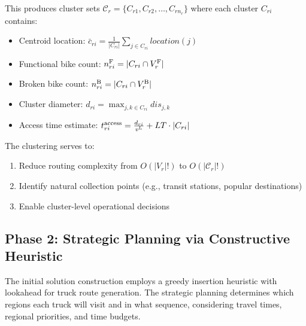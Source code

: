 This produces cluster sets $\mathcal{C}_r = \{C_{r1}, C_{r2}, \ldots, C_{rn_r}\}$ where each cluster $C_{ri}$ contains:
\begin{itemize}
    \item Centroid location: $\bar{c}_{ri} = \frac{1}{|C_{ri}|}\sum_{j \in C_{ri}} location(j)$
    \item Functional bike count: $n_{ri}^{\text{F}} = |C_{ri} \cap V_r^{\text{F}}|$
    \item Broken bike count: $n_{ri}^{\text{B}} = |C_{ri} \cap V_r^{\text{B}}|$
    \item Cluster diameter: $d_{ri} = \max_{j,k \in C_{ri}} dis_{j,k}$
    \item Access time estimate: $t_{ri}^{\text{access}} = \frac{d_{ri}}{v^{\text{L}}} + LT \cdot |C_{ri}|$
\end{itemize}

The clustering serves to:
\begin{enumerate}
    \item Reduce routing complexity from $O(|V_r|!)$ to $O(|\mathcal{C}_r|!)$
    \item Identify natural collection points (e.g., transit stations, popular destinations)
    \item Enable cluster-level operational decisions
\end{enumerate}

\subsection{Phase 2: Strategic Planning via Constructive Heuristic}

The initial solution construction employs a greedy insertion heuristic with lookahead for truck route generation. The strategic planning determines which regions each truck will visit and in what sequence, considering travel times, regional priorities, and time budgets.

